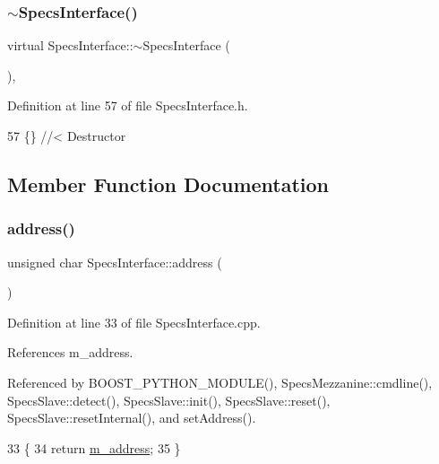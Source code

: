 \subsubsection{\texorpdfstring{$\sim$\+Specs\+Interface()}{~SpecsInterface()}}
{\footnotesize\ttfamily virtual Specs\+Interface\+::$\sim$\+Specs\+Interface (\begin{DoxyParamCaption}{ }\end{DoxyParamCaption})\hspace{0.3cm}{\ttfamily [inline]}, {\ttfamily [virtual]}}



Definition at line 57 of file Specs\+Interface.\+h.


\begin{DoxyCode}
57 \{\} \textcolor{comment}{//< Destructor}
\end{DoxyCode}


\subsection{Member Function Documentation}
\mbox{\label{classSpecsInterface_a0fa039a15b842a5ba783ce825b9915d8}} 
\subsubsection{\texorpdfstring{address()}{address()}}
{\footnotesize\ttfamily unsigned char Specs\+Interface\+::address (\begin{DoxyParamCaption}{ }\end{DoxyParamCaption})}



Definition at line 33 of file Specs\+Interface.\+cpp.



References m\+\_\+address.



Referenced by B\+O\+O\+S\+T\+\_\+\+P\+Y\+T\+H\+O\+N\+\_\+\+M\+O\+D\+U\+L\+E(), Specs\+Mezzanine\+::cmdline(), Specs\+Slave\+::detect(), Specs\+Slave\+::init(), Specs\+Slave\+::reset(), Specs\+Slave\+::reset\+Internal(), and set\+Address().


\begin{DoxyCode}
33                                       \{
34     \textcolor{keywordflow}{return} \hyperlink{classSpecsInterface_a4064da5ca6e0a172363967c4acc0b365}{m\_address};
35 \}
\end{DoxyCode}
\mbox{\label{classSpecsInterface_a24bf2b5e2da6c675ba5de3b226481a73}} 
